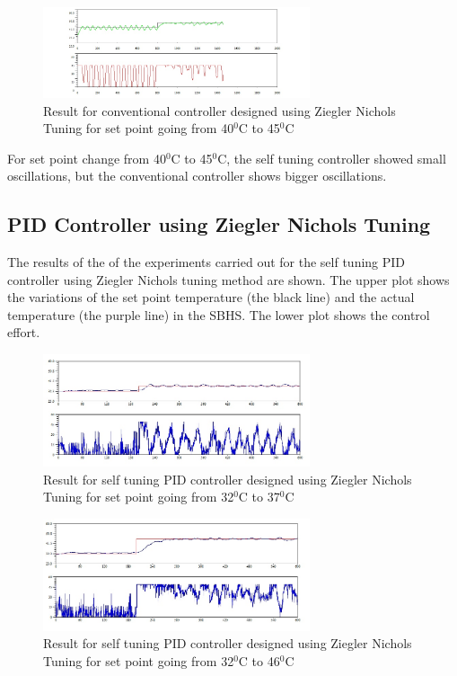 \begin{figure}[h]
		\centering
\includegraphics[width=0.7\textwidth]{Vikas_self/report_tex/PID_results/Conventional_Tuning/Setpointchange/PI/step40to45.jpg}
	\caption{Result for conventional controller designed using Ziegler Nichols Tuning for set point going from 40$^0$C to 45$^0$C }
\end{figure}

For set point change from 40$^0$C to 45$^0$C, the self tuning controller showed small oscillations, but the conventional 
controller shows bigger oscillations.
\newpage

\subsection{PID Controller using Ziegler Nichols Tuning}\label{pidzn}
The results of the of the experiments carried out for the self tuning PID controller using Ziegler Nichols tuning method 
are shown. The upper plot shows the variations of the set point temperature (the black line) and the actual temperature 
(the purple line) in the SBHS. The lower plot shows the control effort.

\begin{figure}[h]
	\centering
\includegraphics[width=0.7\textwidth]{Vikas_self/report_tex/PID_results/self_tuning/NewSetpoint_change/PID/step32to37.jpg}
	\caption{Result for self tuning PID controller designed using Ziegler Nichols Tuning for set point going from 32$^0$C to 37$^0$C}
\end{figure}


\begin{figure}[h]
	\centering
\includegraphics[width=0.7\textwidth]{Vikas_self/report_tex/PID_results/self_tuning/NewSetpoint_change/PID/step32to46.jpg}
	\caption{Result for self tuning PID controller designed using Ziegler Nichols Tuning for set point going from 32$^0$C to 46$^0$C}
\end{figure}

